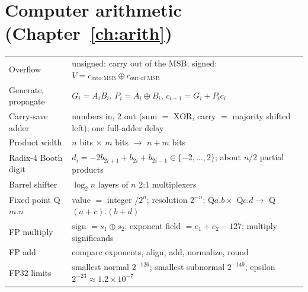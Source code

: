 \section*{Computer arithmetic (Chapter~\ref{ch:arith})}
\begin{center}
\begin{tabularx}{\linewidth}{>{\raggedright\arraybackslash}p{4.6cm}>{\raggedright\arraybackslash}X}
\toprule
Overflow & unsigned: carry out of the MSB; signed: $V = c_{\text{into MSB}} \oplus c_{\text{out of MSB}}$ \\
Generate, propagate & $G_i = A_iB_i$, \; $P_i = A_i \oplus B_i$, \; $c_{i+1} = G_i + P_i c_i$ \\
Carry-save adder & 3 numbers in, 2 out (sum $=$ XOR, carry $=$ majority shifted left); one full-adder delay \\
Product width & $n$ bits $\times$ $m$ bits $\to$ $n + m$ bits \\
Radix-4 Booth digit & $d_i = -2b_{2i+1} + b_{2i} + b_{2i-1} \in \{-2,\dots,2\}$; about $n/2$ partial products \\
Barrel shifter & $\log_2 n$ layers of $n$ 2:1 multiplexers \\
Fixed point Q$m$.$n$ & value $=$ integer $/ 2^n$; resolution $2^{-n}$; Q$a$.$b \times$ Q$c$.$d \to$ Q$(a{+}c)$.$(b{+}d)$ \\
FP multiply & sign $= s_1 \oplus s_2$; exponent field $= e_1 + e_2 - 127$; multiply significands \\
FP add & compare exponents, align, add, normalize, round \\
FP32 limits & smallest normal $2^{-126}$; smallest subnormal $2^{-149}$; epsilon $2^{-23} \approx 1.2\times10^{-7}$ \\
\bottomrule
\end{tabularx}
\end{center}
